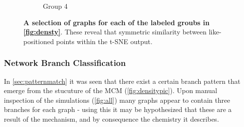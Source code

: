 \begin{figure}[H]
\begin{subfigure}[b]{.23\textwidth}
     \caption{Group 4}
     \end{subfigure}
        \caption{\textbf{A selection of graphs for each of the labeled groubs in \autoref{fig:densty}}. These reveal that symmetric similarity between like-positioned points within the t-SNE output.  }
      \label{fig:densitypic}
\end{figure}




\subsubsection{Network Branch Classification}\label{sec:netshape}
In \autoref{sec:patternmatch} it was seen that there exist a certain branch pattern that emerge from the stucuture of the MCM (\autoref{fig:densitypic}). Upon manual inspection of the simulations (\autoref{fig:all}) many graphs appear to contain three branches for each graph - using this it may be hypothesized that these are a result of the mechanism, and by consequence the chemistry it describes.

